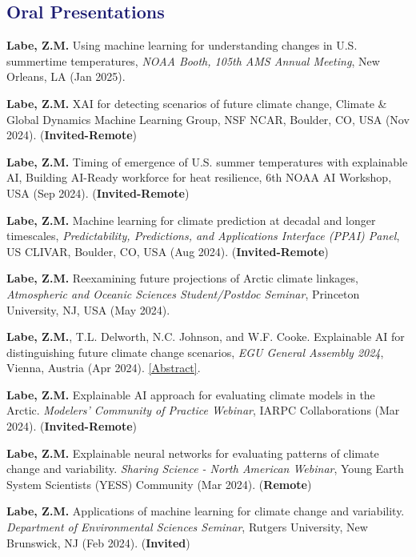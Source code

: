 \documentclass[margin,line,palatino,courier,10pt]{res}
\begin{document}
\begin{resume}
\section{\sc \textcolor{MidnightBlue}{\large{\textbf{Oral Presentations}}}}
\begin{etaremune}[leftmargin=0in,topsep=0in,parsep=0in]
\item \textbf{Labe, Z.M.} Using machine learning for understanding changes in U.S. summertime temperatures, \textit{NOAA Booth, 105th AMS Annual Meeting}, New Orleans, LA (Jan 2025).
\item \textbf{Labe, Z.M.} XAI for detecting scenarios of future climate change, Climate \& Global Dynamics Machine Learning Group, NSF NCAR, Boulder, CO, USA (Nov 2024). (\textbf{Invited-Remote})
\item \textbf{Labe, Z.M.} Timing of emergence of U.S. summer temperatures with explainable AI, Building AI-Ready workforce for heat resilience, 6th NOAA AI Workshop, USA (Sep 2024). (\textbf{Invited-Remote})
\item \textbf{Labe, Z.M.} Machine learning for climate prediction at decadal and longer timescales, \textit{Predictability, Predictions, and Applications Interface (PPAI) Panel}, US CLIVAR, Boulder, CO, USA (Aug 2024). (\textbf{Invited-Remote}) 
\item \textbf{Labe, Z.M.} Reexamining future projections of Arctic climate linkages, \textit{Atmospheric and Oceanic Sciences Student/Postdoc Seminar}, Princeton University, NJ, USA (May 2024). 
\item \textbf{Labe, Z.M.}, T.L. Delworth, N.C. Johnson, and W.F. Cooke. Explainable AI for distinguishing future climate change scenarios, \textit{EGU General Assembly 2024}, Vienna, Austria (Apr 2024). \href{https://meetingorganizer.copernicus.org/EGU24/EGU24-9110.html}{[Abstract]}. 
\item \textbf{Labe, Z.M.} Explainable AI approach for evaluating climate models in the Arctic. \textit{Modelers' Community of Practice Webinar}, IARPC Collaborations (Mar 2024). (\textbf{Invited-Remote}) 
\item \textbf{Labe, Z.M.} Explainable neural networks for evaluating patterns of climate change and variability. \textit{Sharing Science - North American Webinar}, Young Earth System Scientists (YESS) Community (Mar 2024). (\textbf{Remote}) 
\item \textbf{Labe, Z.M.} Applications of machine learning for climate change and variability. \textit{Department of Environmental Sciences Seminar}, Rutgers University, New Brunswick, NJ (Feb 2024). (\textbf{Invited})

\end{etaremune}
\end{resume}
\end{document}
